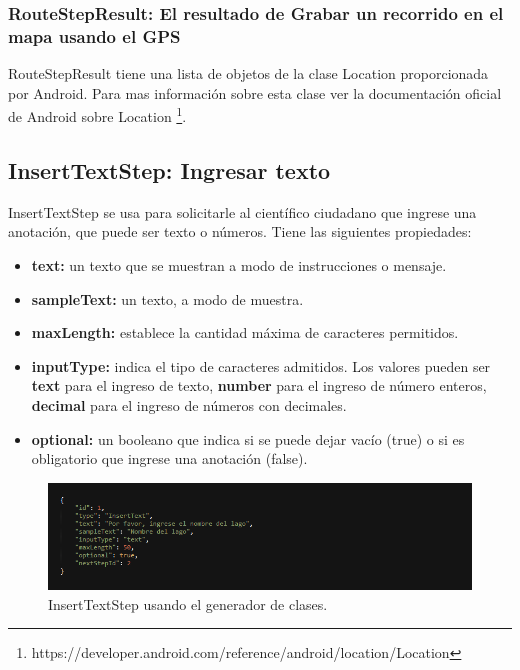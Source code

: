 \subsubsection{RouteStepResult: El resultado de Grabar un recorrido en el mapa usando el GPS}
RouteStepResult tiene una lista de objetos de la clase Location proporcionada por Android.  Para
mas información sobre esta clase ver la documentación oficial de Android sobre Location \footnote{https://developer.android.com/reference/android/location/Location}.






\subsection{InsertTextStep: Ingresar texto}
InsertTextStep se usa para solicitarle al científico ciudadano que ingrese una anotación, que puede ser texto o números. Tiene las siguientes propiedades:

\begin{itemize}
\item \textbf{text:} un texto que se muestran a modo de instrucciones o mensaje.
\item \textbf{sampleText:} un texto, a modo de muestra.
\item \textbf{maxLength:} establece la cantidad máxima de caracteres permitidos.
\item \textbf{inputType:} indica el tipo de caracteres admitidos. Los valores pueden ser \textbf{text} para el ingreso de texto, \textbf{number} para el ingreso de número enteros, \textbf{decimal} para el ingreso de números con decimales.
\item \textbf{optional:} un booleano que indica si se puede dejar vacío (true) o si es obligatorio que ingrese una anotación (false).
\end{itemize}

\begin{figure}[H]
  \centering
    \includegraphics[scale=0.6]{50-anexos/C-steps/insert_text_json.png} 
    \caption{InsertTextStep usando el generador de clases.}
\end{figure}	

